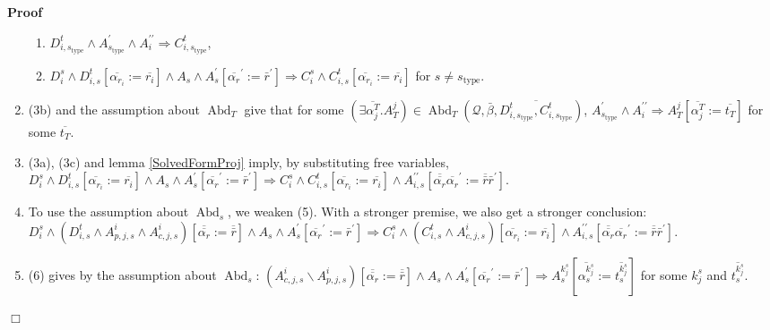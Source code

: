\documentclass{article}
\newcommand{\assign}{:=}
\newcommand{\tmop}[1]{\ensuremath{\operatorname{#1}}}
\newenvironment{proof}{\noindent\textbf{Proof\ }}{\hspace*{\fill}$\Box$\medskip}
\begin{document}
\begin{proof}
\begin{enumerate}
\begin{enumerate}
      \item $D^t_{i, s_{\tmop{type}}} \wedge A^{\prime}_{s_{\tmop{type}}}
      \wedge A^{\prime\prime}_i \Rightarrow C^t_{i, s_{\tmop{type}}}$,
      
      \item $D_i^s \wedge D^t_{i, s} [\overline{\alpha_{r_i}} \assign
      \overline{r_i}] \wedge A_s \wedge A^{\prime}_s
      [\overline{\alpha_r}^{\prime} \assign \bar{r}^{\prime}] \Rightarrow
      C_i^s \wedge C^t_{i, s} [\overline{\alpha_{r_i}} \assign
      \overline{r_i}]$ for $s \neq s_{\tmop{type}}$.
    \end{enumerate}
    \item (3b) and the assumption about $\tmop{Abd}_T$ give that for some
    $(\exists \overline{\alpha_j^T} .A_T^j) \in \tmop{Abd}_T \left(
    \mathcal{Q}, \bar{\beta}, \overline{D_{i, s_{\tmop{type}}}^t, C_{i,
    s_{\tmop{type}}}^t} \right)$, $A^{\prime}_{s_{\tmop{type}}} \wedge
    A^{\prime\prime}_i \Rightarrow A_T^j [\overline{\alpha_j^T} \assign
    \overline{t_T}]$ for some $\overline{t_T}$.
    
    \item (3a), (3c) and lemma \ref{SolvedFormProj} imply, by substituting
    free variables, $D_i^s \wedge D^t_{i, s} [\overline{\alpha_{r_i}} \assign
    \overline{r_i}] \wedge A_s \wedge A^{\prime}_s
    [\overline{\alpha_r}^{\prime} \assign \bar{r}^{\prime}] \Rightarrow C_i^s
    \wedge C^t_{i, s} [\overline{\alpha_{r_i}} \assign \overline{r_i}] \wedge
    A^{\prime\prime}_{i, s} [\overline{\overline{\alpha_r}}
    \overline{\alpha_r}^{\prime} \assign \overline{\bar{r}}
    \bar{r}^{\prime}]$.
    
    \item To use the assumption about $\tmop{Abd}_s$, we weaken (5). With a
    stronger premise, we also get a stronger conclusion: $D_i^s \wedge
    (D^t_{i, s} \wedge A^i_{p, j, s} \wedge A^i_{c, j, s})
    [\overline{\overline{\alpha_r}} \assign \overline{\bar{r}}] \wedge A_s
    \wedge A^{\prime}_s [\overline{\alpha_r}^{\prime} \assign
    \bar{r}^{\prime}] \Rightarrow C_i^s \wedge (C^t_{i, s} \wedge A^i_{c, j,
    s}) [\overline{\alpha_{r_i}} \assign \overline{r_i}] \wedge
    A^{\prime\prime}_{i, s} [\overline{\overline{\alpha_r}}
    \overline{\alpha_r}^{\prime} \assign \overline{\bar{r}}
    \bar{r}^{\prime}]$.
    
    \item (6) gives by the assumption about $\tmop{Abd}_s$: $(A^i_{c, j, s}
    \backslash A^i_{p, j, s}) [\overline{\overline{\alpha_r}} \assign
    \overline{\bar{r}}] \wedge A_s \wedge A^{\prime}_s
    [\overline{\alpha_r}^{\prime} \assign \bar{r}^{\prime}] \Rightarrow
    A_s^{k_j^s} \left[ \overline{\alpha_s^{k_j^s}} \assign
    \overline{t_s^{k_j^s}} \right]$ for some $k_j^s$ and
    $\overline{t_s^{k_j^s}}$.
    

\end{enumerate}
\end{proof}
\end{document}
